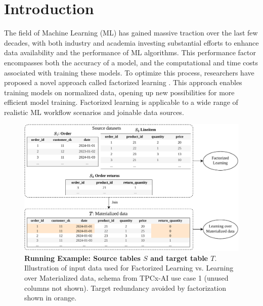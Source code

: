 
\chapter{Introduction}
\label{chapter:introduction}

The field of Machine Learning (ML) has gained massive traction over the last few decades, with both industry and academia investing substantial efforts to enhance data availability and the performance of ML algorithms. This performance factor encompasses both the accuracy of a model, and the computational and time costs associated with training these models.  To optimize this process, researchers have proposed a novel approach called factorized learning \cite{orion_learning_gen_lin_models}. This approach enables training models on normalized data, opening up new possibilities for more efficient model training. Factorized learning is applicable to a wide range of realistic ML workflow scenarios and joinable data sources.

\begin{figure}[h]
    \centering
    \includegraphics[width=0.95\linewidth]{chapters/01_introduction/figures/running-example-intro.pdf}
    \caption[Running Example: Source tables $S$ and target table $T$]{\textbf{Running Example: Source tables $S$ and target table $T$}. \\ Illustration of input data used for Factorized Learning vs. Learning over Materialized data, schema from TPCx-AI \cite{tpcx-ai} use case 1 (unused columns not shown). Target redundancy avoided by factorization shown in orange.}
    \label{fig:running-example-fac-vs-mat}
\end{figure}

